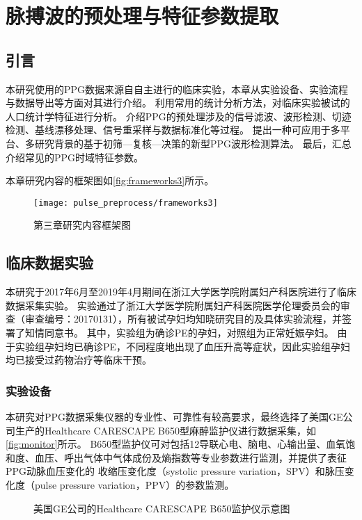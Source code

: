 \chapter{脉搏波的预处理与特征参数提取}
\section{引言}
本研究使用的PPG数据来源自自主进行的临床实验，本章从实验设备、实验流程与数据导出等方面对其进行介绍。
利用常用的统计分析方法，对临床实验被试的人口统计学特征进行分析。
介绍PPG的预处理涉及的信号滤波、波形检测、切迹检测、基线漂移处理、信号重采样与数据标准化等过程。
提出一种可应用于多平台、多研究背景的基于初筛—复核—决策的新型PPG波形检测算法。
最后，汇总介绍常见的PPG时域特征参数。

本章研究内容的框架图如\autoref{fig:frameworks3}所示。

\begin{figure}[htbp]
    \centering
    \texttt{[image: pulse\_preprocess/frameworks3]}
    \caption{\label{fig:frameworks3}第三章研究内容框架图}
\end{figure}
\section{临床数据实验}
本研究于2017年6月至2019年4月期间在浙江大学医学院附属妇产科医院进行了临床数据采集实验。
实验通过了浙江大学医学院附属妇产科医院医学伦理委员会的审查（审查编号：20170131），所有被试孕妇均知晓研究目的及具体实验流程，并签署了知情同意书。
其中，实验组为确诊PE的孕妇，对照组为正常妊娠孕妇。
由于实验组孕妇均已确诊PE，不同程度地出现了血压升高等症状，因此实验组孕妇均已接受过药物治疗等临床干预。

\subsection{实验设备}
本研究对PPG数据采集仪器的专业性、可靠性有较高要求，最终选择了美国GE公司生产的Healthcare CARESCAPE B650型麻醉监护仪进行数据采集，如\autoref{fig:monitor}所示。
B650型监护仪可对包括12导联心电、脑电、心输出量、血氧饱和度、血压、呼出气体中气体成份及熵指数等专业参数进行监测，并提供了表征PPG动脉血压变化的
收缩压变化度（systolic pressure variation，SPV）和脉压变化度（pulse pressure variation，PPV）的参数监测\cite{GE2021,Michard1999}。
\begin{figure}[htbp]
    \centering
    \quad
    \caption{\label{fig:monitor}美国GE公司的Healthcare CARESCAPE B650监护仪示意图}
\end{figure}

